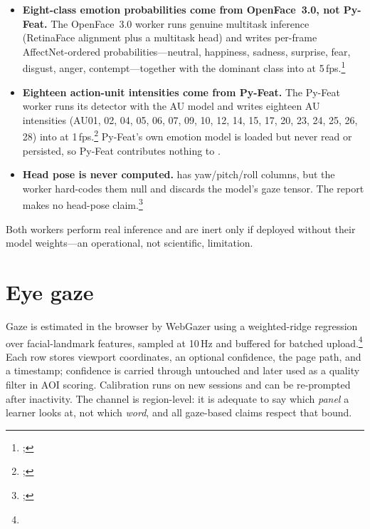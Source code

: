 \begin{itemize}
  \item \textbf{Eight-class emotion probabilities come from OpenFace~3.0,
  not Py-Feat.} The OpenFace~3.0 worker runs genuine multitask inference
  (RetinaFace alignment \citep{deng2020retinaface} plus a multitask head) and writes per-frame
  AffectNet-ordered probabilities---neutral, happiness, sadness,
  surprise, fear, disgust, anger, contempt---together with the dominant
  class into  at 5\,fps.\footnote{;
  }
  \item \textbf{Eighteen action-unit intensities come from Py-Feat.} The
  Py-Feat worker runs its detector with the  AU model and writes
  eighteen AU intensities (AU01, 02, 04, 05, 06, 07, 09, 10, 12, 14, 15,
  17, 20, 23, 24, 25, 26, 28) into  at
  1\,fps.\footnote{;
  } Py-Feat's own emotion model is loaded
  but never read or persisted, so Py-Feat contributes nothing to
  .
  \item \textbf{Head pose is never computed.}  has
  yaw/pitch/roll columns, but the worker hard-codes them null and discards
  the model's gaze tensor. The report makes no head-pose
  claim.\footnote{;
  }
\end{itemize}

Both workers perform real inference and are inert only if deployed without
their model weights---an operational, not scientific, limitation.

\section{Eye gaze}
\label{sec:sensing-gaze}

Gaze is estimated in the browser by WebGazer
\citep{papoutsaki2016webgazer} using a weighted-ridge regression over
facial-landmark features, sampled at 10\,Hz and buffered for batched
upload.\footnote{} Each
 row stores viewport coordinates, an optional
confidence, the page path, and a timestamp; confidence is carried through
untouched and later used as a quality filter in AOI scoring. Calibration
runs on new sessions and can be re-prompted after inactivity. The channel
is region-level: it is adequate to say which \emph{panel} a learner looks
at, not which \emph{word}, and all gaze-based claims respect that bound.


